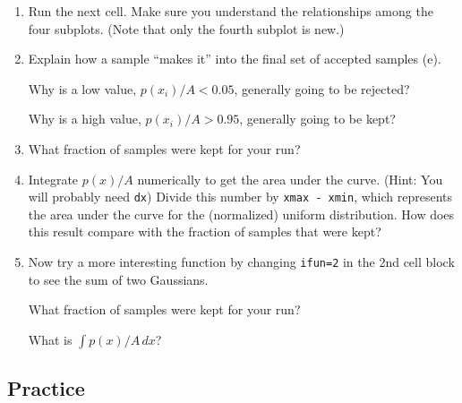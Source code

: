 \documentclass[11pt,titlepage,fleqn]{article}
\begin{document}
\begin{enumerate}
\vertgap

\item Run the next cell. Make sure you understand the relationships among the four subplots. (Note that only the fourth subplot is new.)

\vertgap

\item Explain how a sample ``makes it'' into the final set of accepted samples (e).

Why is a low value, $p(x_i)/A < 0.05$, generally going to be rejected?

Why is a high value, $p(x_i)/A > 0.95$, generally going to be kept?

\vertgap

\item What fraction of samples were kept for your run?

\vertgap

\item Integrate $p(x)/A$ numerically to get the area under the curve. (Hint: You will probably need \verb+dx+) Divide this number by \verb+xmax - xmin+, which represents the area under the curve for the (normalized) uniform distribution. How does this result compare with the fraction of samples that were kept?

\vertgap

\item Now try a more interesting function by changing \verb+ifun=2+ in the 2nd cell block to see the sum of two Gaussians.

What fraction of samples were kept for your run?

What is $\int p(x)/A \, dx$?

\end{enumerate}


\subsection*{Practice}
\end{document}
